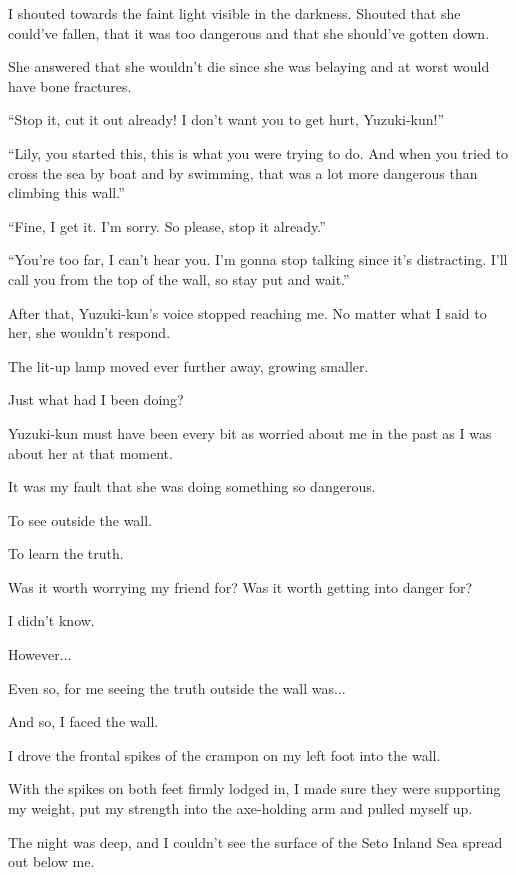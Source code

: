 \begin{center}
\begin{graphpaperBox}[enhanced,box align=center,colframe=diaryborder,width=0.9\textwidth]
I shouted towards the faint light visible in the darkness. Shouted that she could've fallen, that it was too dangerous and that she should've gotten down.

She answered that she wouldn't die since she was belaying and at worst would have bone fractures.

``Stop it, cut it out already! I don't want you to get hurt, Yuzuki-kun!''

``Lily, you started this, this is what you were trying to do. And when you tried to cross the sea by boat and by swimming, that was a lot more dangerous than climbing this wall.''

``Fine, I get it. I'm sorry. So please, stop it already.''

``You're too far, I can't hear you. I'm gonna stop talking since it's distracting. I'll call you from the top of the wall, so stay put and wait.''

After that, Yuzuki-kun's voice stopped reaching me. No matter what I said to her, she wouldn't respond.

The lit-up lamp moved ever further away, growing smaller.

Just what had I been doing?

Yuzuki-kun must have been every bit as worried about me in the past as I was about her at that moment.

It was my fault that she was doing something so dangerous.

To see outside the wall.

To learn the truth.

Was it worth worrying my friend for? Was it worth getting into danger for?

I didn't know.

However...

Even so, for me seeing the truth outside the wall was...

\end{graphpaperBox}
\end{center}

\newpage

And so, I faced the wall.

I drove the frontal spikes of the crampon on my left foot into the wall.

With the spikes on both feet firmly lodged in, I made sure they were supporting my weight, put my strength into the axe-holding arm and pulled myself up.

The night was deep, and I couldn't see the surface of the Seto Inland Sea spread out below me.

